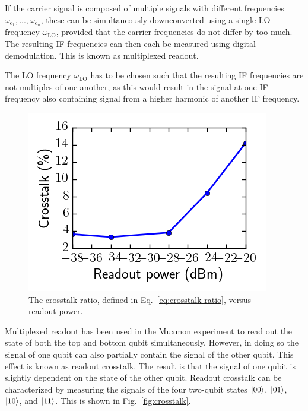           If the carrier signal is composed of multiple signals with different frequencies $\omega_{\text{c}_1}, ..., \omega_{\text{c}_n}$, these can be simultaneously downconverted using a single LO frequency $\omega_\text{LO}$, provided that the carrier frequencies do not differ by too much. The resulting IF frequencies can then each be measured using digital demodulation. This is known as multiplexed readout.

          The LO frequency $\omega_\text{LO}$ has to be chosen such that the resulting IF frequencies are not multiples of one another, as this would result in the signal at one IF frequency also containing signal from a higher harmonic of another IF frequency.

          \begin{figure}
            \begin{center}
            \vspace{-30pt}
              \includegraphics[width=\textwidth]{Figures/Calibration routines/crosstalk ratio.png}
            \end{center}
            \vspace{-20 pt}
            \caption{The crosstalk ratio, defined in Eq.~\ref{eq:crosstalk ratio}, versus readout power.}
            \label{fig:crosstalk ratio}
          \end{figure}

          Multiplexed readout has been used in the Muxmon experiment to read out the state of both the top and bottom qubit simultaneously. However, in doing so the signal of one qubit can also partially contain the signal of the other qubit. This effect is known as readout crosstalk. The result is that the signal of one qubit is slightly dependent on the state of the other qubit. Readout crosstalk can be characterized by measuring the signals of the four two-qubit states $\ket{00}$, $\ket{01}$, $\ket{10}$, and $\ket{11}$. This is shown in Fig.~\ref{fig:crosstalk}.

